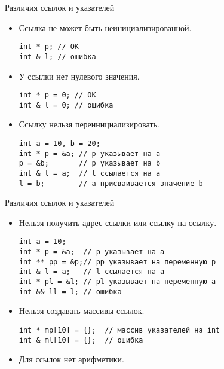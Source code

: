 \documentclass{beamer}
\begin{document}
\begin{frame}[fragile]{Различия ссылок и указателей}
    \begin{itemize}
        \item Ссылка не может быть неинициализированной.
\begin{lstlisting}
int * p; // OK
int & l; // ошибка
\end{lstlisting}

        \item У ссылки нет нулевого значения.            
\begin{lstlisting}
int * p = 0; // OK
int & l = 0; // ошибка
\end{lstlisting}
            
    \item Ссылку нельзя переинициализировать.
\begin{lstlisting}
int a = 10, b = 20;
int * p = &a; // p указывает на a
p = &b;       // p указывает на b
int & l = a;  // l ссылается на a
l = b;        // a присваивается значение b
\end{lstlisting}
\end{itemize}
\end{frame}

\begin{frame}[fragile]{Различия ссылок и указателей}
    \begin{itemize}
        \item Нельзя получить адрес ссылки или ссылку на ссылку.
\begin{lstlisting}
int a = 10;
int * p = &a;  // p указывает на a
int ** pp = &p;// pp указывает на переменную p
int & l = a;   // l ссылается на a
int * pl = &l; // pl указывает на переменную a
int && ll = l; // ошибка
\end{lstlisting}

        \item Нельзя создавать массивы ссылок.
\begin{lstlisting}
int * mp[10] = {};  // массив указателей на int
int & ml[10] = {};  // ошибка
\end{lstlisting}

        \item Для ссылок нет арифметики.

    \end{itemize}
\end{frame}
\end{document}
